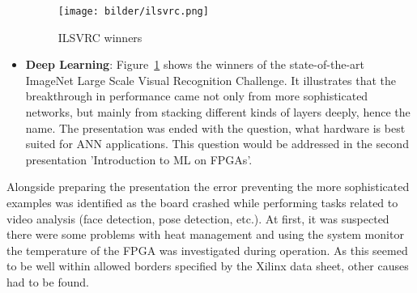 \begin{itemize}
	\begin{figure}[!htb]
	\centering
		\texttt{[image: bilder/ilsvrc.png]}
		\caption{ILSVRC winners}
		\label{fig:ilsvrc}
\end{figure}
	\item \textbf{Deep Learning}: Figure~\ref{fig:ilsvrc} shows the winners of the state-of-the-art ImageNet Large Scale Visual Recognition Challenge. It illustrates that the breakthrough in performance came not only from more sophisticated networks, but mainly from stacking different kinds of layers deeply, hence the name. The presentation was ended with the question, what hardware is best suited for \ac{ANN} applications. This question would be addressed in the second presentation 'Introduction to \ac{ML} on \acp{FPGA}'.
\end{itemize}
Alongside preparing the presentation the error preventing the more sophisticated examples was identified as the board crashed while performing tasks related to video analysis (face detection, pose detection, etc.). At first, it was suspected there were some problems with heat management and using the system monitor the temperature of the \ac{FPGA} was investigated during operation. As this seemed to be well within allowed borders specified by the Xilinx data sheet, other causes had to be found.